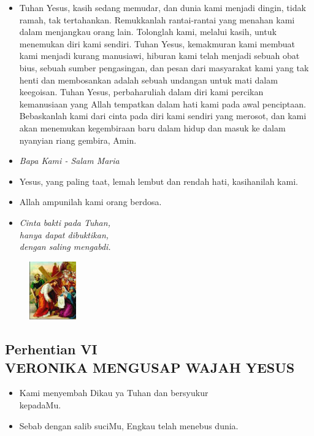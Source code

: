 \documentclass[a5paper,headsepline,titlepage,10pt,nnormalheadings,DIVcalc]{scrbook}
\newcommand{\BU}[1]{\begin{itemize} \item[U:] #1 \end{itemize}}
\newcommand{\BP}[1]{\begin{itemize} \item[P:] #1 \end{itemize}}
\newcommand{\kamiMenyembah}{\BP{ Kami menyembah Dikau ya Tuhan dan bersyukur\\kepadaMu.}
\BU{ Sebab dengan salib suciMu, Engkau telah menebus dunia.}
}
\newcommand{\kasihanilahKami}{\BP{Yesus, yang paling taat, lemah lembut dan rendah hati, kasihanilah kami.}
\BU{Allah ampunilah kami orang berdosa.}}
\begin{document}
\BU{Tuhan Yesus, kasih sedang memudar, dan dunia kami menjadi dingin, tidak ramah, tak tertahankan. Remukkanlah rantai-rantai yang menahan kami dalam menjangkau orang lain. Tolonglah kami, melalui kasih, untuk menemukan diri kami sendiri. Tuhan Yesus, kemakmuran kami membuat kami menjadi kurang manusiawi, hiburan kami telah menjadi sebuah obat bius, sebuah sumber pengasingan, dan pesan dari masyarakat kami yang tak henti dan membosankan adalah sebuah undangan untuk mati dalam keegoisan. Tuhan Yesus, perbaharuliah dalam diri kami percikan kemanusiaan yang Allah tempatkan dalam hati kami pada awal penciptaan. Bebaskanlah kami dari cinta pada diri kami sendiri yang merosot, dan kami akan menemukan kegembiraan baru dalam hidup dan masuk ke dalam nyanyian riang gembira, Amin.}

\large\begin{itemize}\item[~]\it{Bapa Kami - Salam Maria}\end{itemize}\normalsize
\kasihanilahKami

\begin{itemize}
\item[6.] \it{Cinta bakti pada Tuhan,\\ 
	hanya dapat dibuktikan, \\
	dengan saling mengabdi.}
\end{itemize}

\begin{figure}
\includegraphics[width=2cm]{jalansalib_files/06_small.jpg}
\end{figure}
\subsection*{Perhentian VI\\
VERONIKA MENGUSAP WAJAH YESUS}

\kamiMenyembah
\end{document}
